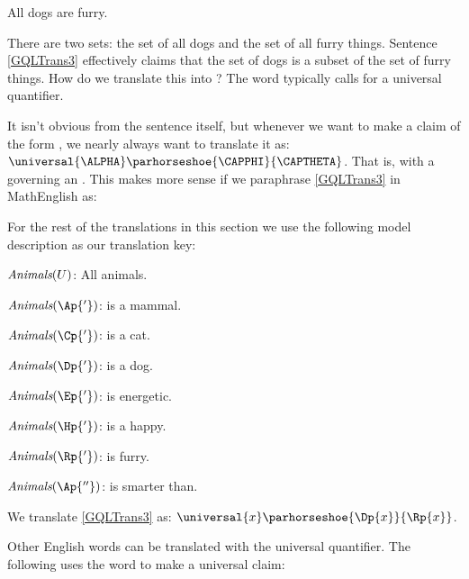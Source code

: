 \begin{menumerate}
	\item\label{GQLTrans3} All dogs are furry.
\end{menumerate}

\noindent{}There are two sets: the set of all dogs and the set of all furry things.
Sentence \ref{GQLTrans3} effectively claims that the set of dogs is a subset of the set of furry things.
How do we translate this into \GQL{}?
The word  typically calls for a universal quantifier.

It isn't obvious from the sentence itself, but whenever we want to make a claim of the form , we nearly always want to translate it as: $\universal{\ALPHA}\parhorseshoe{\CAPPHI}{\CAPTHETA}$.
That is, with a \mention{$\forall$} governing an \mention{$\HORSESHOE$}.
This makes more sense if we paraphrase \ref{GQLTrans3} in MathEnglish as: 

For the rest of the translations in this section we use the following model description as our translation key:

\begin{description}[itemsep=0em]
	\item[Animals model:] \hfill{} 
	\begin{description}[itemsep=0em]
		\item[] $\emph{Animals}(U)$: All animals.
		\item[] $\emph{Animals}(\Ap{'})$: is a mammal.
		\item[] $\emph{Animals}(\Cp{'})$: is a cat.
		\item[] $\emph{Animals}(\Dp{'})$: is a dog.
		\item[] $\emph{Animals}(\Ep{'})$: is energetic.
		\item[] $\emph{Animals}(\Hp{'})$: is a happy.
		\item[] $\emph{Animals}(\Rp{'})$: is furry.
		\item[] $\emph{Animals}(\Ap{''})$: is smarter than.
	\end{description}
\end{description}

\noindent{}We translate \ref{GQLTrans3} as: $\universal{\variable{x}}\parhorseshoe{\Dp{\variable{x}}}{\Rp{\variable{x}}}$.

Other English words can be translated with the universal quantifier.
The following uses the word  to make a universal claim:

